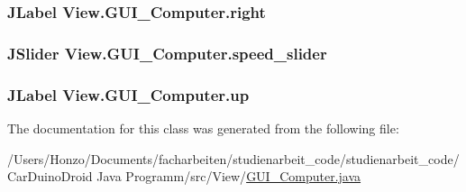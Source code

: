 \subsubsection[{right}]{\setlength{\rightskip}{0pt plus 5cm}J\+Label View.\+G\+U\+I\+\_\+\+Computer.\+right}\label{class_view_1_1_g_u_i___computer_a19428a54eca1c7b361fc8f92b585f110}
\hypertarget{class_view_1_1_g_u_i___computer_af9fb9995bca970a583e0a9f56f0dd353}{}
\subsubsection[{speed\+\_\+slider}]{\setlength{\rightskip}{0pt plus 5cm}J\+Slider View.\+G\+U\+I\+\_\+\+Computer.\+speed\+\_\+slider}\label{class_view_1_1_g_u_i___computer_af9fb9995bca970a583e0a9f56f0dd353}
\hypertarget{class_view_1_1_g_u_i___computer_aee5114c982485cd981782c44c18d7b3a}{}
\subsubsection[{up}]{\setlength{\rightskip}{0pt plus 5cm}J\+Label View.\+G\+U\+I\+\_\+\+Computer.\+up}\label{class_view_1_1_g_u_i___computer_aee5114c982485cd981782c44c18d7b3a}


The documentation for this class was generated from the following file\+:\begin{DoxyCompactItemize}
\item 
/\+Users/\+Honzo/\+Documents/facharbeiten/studienarbeit\+\_\+code/studienarbeit\+\_\+code/\+Car\+Duino\+Droid Java Programm/src/\+View/\hyperlink{_g_u_i___computer_8java}{G\+U\+I\+\_\+\+Computer.\+java}\end{DoxyCompactItemize}
